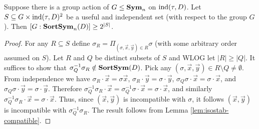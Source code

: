 \documentclass[../paper.tex]{subfiles}
\begin{document}


\begin{lem}
  \label{lem:useful-independant-set}
  Suppose there is a group action of $G \leq \text{\textbf{Sym}}_n$ on $\text{\upshape ind}(\tau, D)$. Let
  $S \subseteq G \times \text{\upshape ind}(\tau, D)^2$ be a useful and independent set (with respect to the group $G$).
  Then $[G : \text{\textbf{SortSym}}_n(D)] \geq 2^{\vert S \vert}$.
\end{lem}

\begin{proof}
  For any $R \subseteq S$ define $\sigma_R = \Pi_{(\sigma, \vec{x}, \vec{y}) \in
    R} \sigma$ (with some arbitrary order assumed on $S$). Let $R$ and $Q$ be
  distinct subsets of $S$ and WLOG let $\vert R \vert \geq \vert Q \vert$. It
  suffices to show that $\sigma^{-1}_Q \sigma_R \notin \text{\textbf{SortSym}} (D)$. Pick
  any $(\sigma, \vec{x}, \vec{y}) \in R \setminus Q \neq \emptyset$.
 From
  independence we have $\sigma_R \cdot \vec{x} = \sigma \vec{x}$, $\sigma_R
  \cdot \vec{y} = \sigma \cdot \vec{y}$, $\sigma_Q \sigma \cdot \vec{x} = \sigma
  \cdot \vec{x} $, and $\sigma_Q \sigma \cdot \vec{y} = \sigma \cdot \vec{y}$.
  Therefore $\sigma^{-1}_Q \sigma_R \cdot \vec{x} = \sigma^{-1}_Q \sigma \cdot
  \vec{x} = \sigma \cdot \vec{x}$, and similarly $\sigma^{-1}_Q\sigma_R \cdot
  \vec{x} = \sigma \cdot \vec{x}$. Thus, since $(\vec{x}, \vec{y})$ is
  incompatible with $\sigma$, it follows $(\vec{x}, \vec{y})$ is incompatible
  with $\sigma^{-1}_Q\sigma_R$. The result follows from Lemma
  \ref{lem:isostab-compatible}.
\end{proof}

\end{document}
